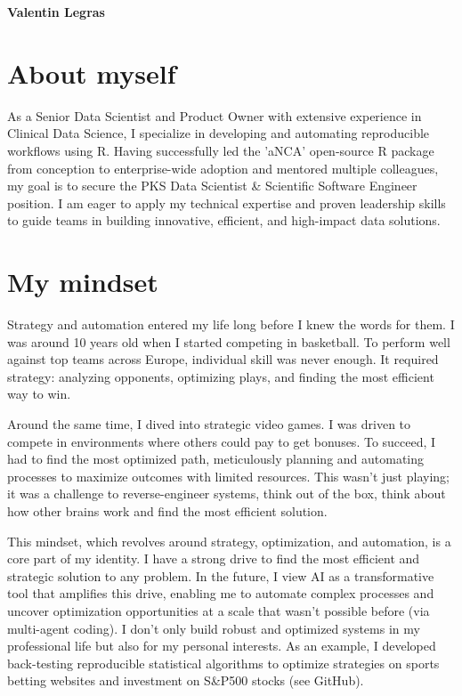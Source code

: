 \documentclass[11pt,a4paper]{article}
\newcommand{\Position}{PKS Data Scientist \& Scientific Software Engineer}
\begin{document}
{\Large\bfseries\color{accent} Valentin Legras}\\[10pt]

\section{About myself}
As a Senior Data Scientist and Product Owner with extensive experience in
Clinical Data Science, I specialize in developing and automating reproducible
workflows using R. Having successfully led the 'aNCA' open-source R package from
conception to enterprise-wide adoption and mentored multiple colleagues, my goal
is to secure the \Position{} position. I am eager to apply my technical expertise
and proven leadership skills to guide teams in building innovative, efficient,
and high-impact data solutions.

\section{My mindset}
Strategy and automation entered my life long before I knew the words for them. I
was around 10 years old when I started competing in basketball. To perform well
against top teams across Europe, individual skill was never enough. It required
strategy: analyzing opponents, optimizing plays, and finding the most efficient
way to win.

Around the same time, I dived into strategic video games. I was driven to compete
in environments where others could pay to get bonuses. To succeed, I had to find
the most optimized path, meticulously planning and automating processes to
maximize outcomes with limited resources. This wasn't just playing; it was a
challenge to reverse-engineer systems, think out of the box, think about how
other brains work and find the most efficient solution.

This mindset, which revolves around strategy, optimization, and automation, is a
core part of my identity. I have a strong drive to find the most efficient and
strategic solution to any problem. In the future, I view AI as a transformative
tool that amplifies this drive, enabling me to automate complex processes and
uncover optimization opportunities at a scale that wasn't possible before (via
multi-agent coding). I don't only build robust and optimized systems in my
professional life but also for my personal interests. As an example, I developed
back-testing reproducible statistical algorithms to optimize strategies on sports
betting websites and investment on S\&P500 stocks (see GitHub).
\end{document}
